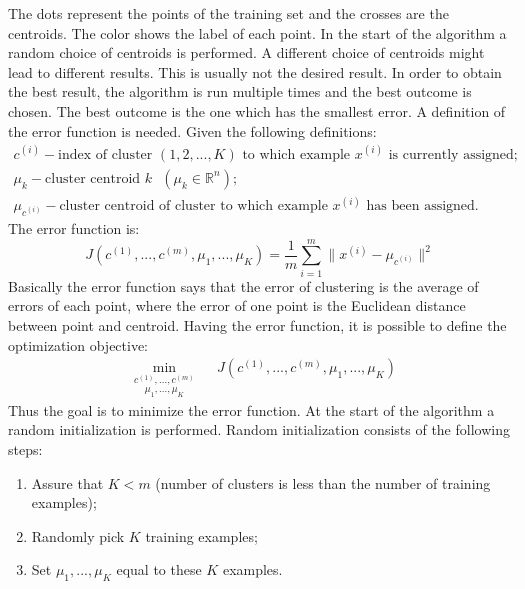         \noindent The dots represent the points of the training set and the crosses are the centroids. The color shows the label of each point.
        In the start of the algorithm a random choice of centroids is performed. A different choice of centroids might lead to different results. This is usually not the desired result. In order to obtain the best result, the algorithm is run multiple times and the best outcome is chosen. The best outcome is the one which has the smallest error. A definition of the error function is needed. Given the following definitions:
        \begin{gather}
        \nonumber
          c^{(i)} - \text{index of cluster } (1, 2, ... , K) \text{ to which example } x^{(i)} \text{ is currently assigned}; \\
          \nonumber
          \mu_k - \text{cluster centroid } k  \text{ } (\mu_k \in \mathbb{R}^n); \\
          \nonumber
          \mu_{c^{(i)}} - \text{cluster centroid of cluster to which example } x^{(i)} \text{ has been assigned}.
        \end{gather}
        The error function is:
        \begin{equation}
          J(c^{(1)}, ..., c^{(m)}, \mu_1, ..., \mu_K) = \frac{1}{m}\sum_{i=1}^{m}\|x^{(i)} - \mu_{c^{(i)}}\|^2
        \end{equation}
        Basically the error function says that the error of clustering is the average of errors of each point, where the error of one point is the Euclidean distance between point and centroid. Having the error function, it is possible to define the optimization objective:
        \begin{equation}
        \begin{aligned}
        & \underset{ \mu_1, ..., \mu_K} { \underset{c^{(1)}, ..., c^{(m)}} {\text{min}} }
        & &  J(c^{(1)}, ..., c^{(m)}, \mu_1, ..., \mu_K)
        \end{aligned}
        \end{equation}
        Thus the goal is to minimize the error function. At the start of the algorithm a random initialization is performed. Random initialization consists of the following steps:
        \begin{enumerate}[topsep=5pt, partopsep=0pt,itemsep=3pt,parsep=1pt]
        \item Assure that \( K < m \) (number of clusters is less than the number of training examples);
        \item Randomly pick \( K \) training examples;
        \item Set \( \mu_1, ..., \mu_K \) equal to these \( K \) examples.
        \end{enumerate}


